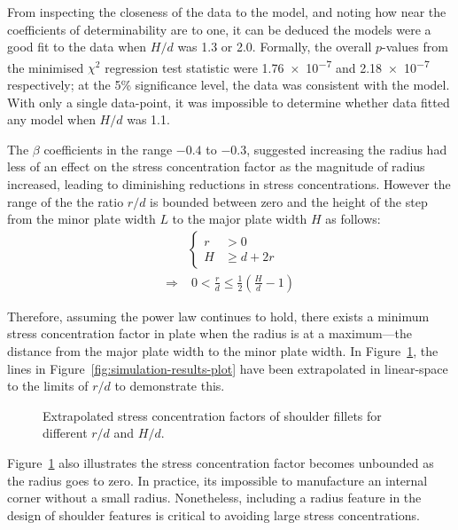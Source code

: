 \documentclass[a4paper,11pt,twocolumn]{article}
\begin{document}
From inspecting the closeness of the data to the model, and noting how near the
coefficients of determinability are to one, it can be deduced the models were a
good fit to the data when $H/d$ was 1.3 or 2.0. Formally, the overall $p$-values
from the minimised $\chi^2$ regression test statistic were \num{1.76e-7} and
\num{2.18e-7} respectively; at the 5\% significance level, the data was
consistent with the model. With only a single data-point, it was impossible to
determine whether data fitted any model when $H/d$ was 1.1.

The $\beta$ coefficients in the range $-0.4$ to $-0.3$, suggested increasing the
radius had less of an effect on the stress concentration factor as the magnitude
of radius increased, leading to diminishing reductions in stress concentrations.
However the range of the the ratio $r/d$ is bounded between zero and the height
of the step from the minor plate width $L$ to the major plate width $H$ as
follows:
\begin{align}
    \nonumber
    &\left\{
    \begin{aligned}
        r &> 0 \\
        H &\geq d + 2 r
    \end{aligned}
    \right. \\
    \Rightarrow
    &\;0 < \frac{r}{d} \leq \frac{1}{2}\left(\frac{H}{d} - 1\right)
\end{align}

Therefore, assuming the power law continues to hold, there exists a minimum
stress concentration factor in plate when the radius is at a maximum---the
distance from the major plate width to the minor plate width. In 
Figure~\ref{fig:simulation-extrapolated}, the lines in
Figure~\vref{fig:simulation-results-plot} have been extrapolated in linear-space
to the limits of $r/d$ to demonstrate this.

\begin{figure}[h]
    \small
    \centering
    \def\svgwidth{\linewidth}
    
    \caption{Extrapolated stress concentration factors of shoulder fillets for
        different $r/d$ and $H/d$.}
    \label{fig:simulation-extrapolated}
\end{figure}

Figure~\ref{fig:simulation-extrapolated} also illustrates the stress 
concentration factor becomes unbounded as the radius goes to zero. In practice,
its impossible to manufacture an internal corner without a small radius.
Nonetheless, including a radius feature in the design of shoulder features is
critical to avoiding large stress concentrations.
\end{document}
